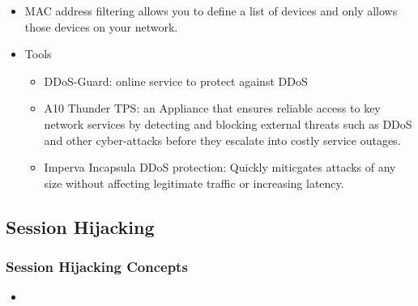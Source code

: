 \begin{itemize}
    \item MAC address filtering allows you to define a list of devices and only allows those devices on your network.
    \item Tools
    \begin{itemize}
        \item DDoS-Guard: online service to protect against DDoS
        \item A10 Thunder TPS: an Appliance that ensures reliable access to key network services by detecting and blocking external threats such as DDoS and other cyber-attacks before they escalate into costly service outages.
        \item Imperva Incapsula DDoS protection: Quickly miticgates attacks of any size without affecting legitimate traffic or increasing latency.
    \end{itemize}
\end{itemize}

\subsection{Session Hijacking}
\subsubsection{Session Hijacking Concepts}
\begin{itemize}
    \item 
\end{itemize}
